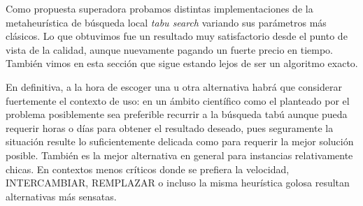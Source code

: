 Como propuesta superadora probamos distintas implementaciones de la metaheurística de búsqueda local \emph{tabu search} variando sus parámetros más clásicos. Lo que obtuvimos fue un resultado muy satisfactorio desde el punto de vista de la calidad, aunque nuevamente pagando un fuerte precio en tiempo. También vimos en esta sección que sigue estando lejos de ser un algoritmo exacto.

En definitiva, a la hora de escoger una u otra alternativa habrá que considerar fuertemente el contexto de uso: en un ámbito científico como el planteado por el problema posiblemente sea preferible recurrir a la búsqueda tabú aunque pueda requerir horas o días para obtener el resultado deseado, pues seguramente la situación resulte lo suficientemente delicada como para requerir la mejor solución posible. También es la mejor alternativa en general para instancias relativamente chicas. En contextos menos críticos donde se prefiera la velocidad, INTERCAMBIAR, REMPLAZAR o incluso la misma heurística golosa resultan alternativas más sensatas.  



